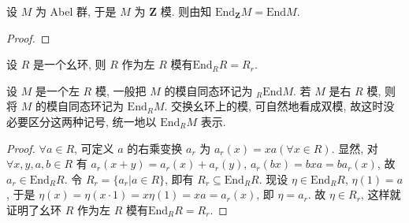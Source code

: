 \documentclass[../../main.tex]{subfiles}
\begin{document}
\begin{example}
设 \( M \) 为 Abel 群, 于是 \( M \) 为 \( \mathbf{Z} \) 模. 则由知 \( \text{End}_\mathbf{Z} M = \text{End}M \).
\end{example}
\begin{proof}

\end{proof}

\begin{example}
设 \( R \) 是一个幺环, 则 \( R \) 作为左 \( R \) 模有\( \text{End}_R R = R_r \).
\end{example}
\begin{remark}
设 \( M \) 是一个左 \( R \) 模, 一般把 \( M \) 的模自同态环记为 \( _R\text{End}M \). 若 \( M \) 是右 \( R \) 模, 则将 \( M \) 的模自同态环记为 \( \text{End}_R M \). 交换幺环上的模, 可自然地看成双模, 故这时没必要区分这两种记号, 统一地以 \( \text{End}_R M \) 表示.
\end{remark}
\begin{proof}
\( \forall a \in R \), 可定义 \( a \) 的右乘变换 \( a_r \) 为 \( a_r(x) = xa (\forall x \in R) \). 显然, 对 \( \forall x, y, a, b \in R \) 有 \( a_r(x + y) = a_r(x) + a_r(y) \), \( a_r(bx) = bxa = ba_r(x) \), 故 \( a_r \in \text{End}_R R \). 令 \( R_r = \{a_r|a \in R\} \), 即有 \( R_r \subseteq \text{End}_R R \). 现设 \( \eta \in \text{End}_R R \), \( \eta(1) = a \), 于是 \( \eta(x) = \eta(x \cdot 1) = x\eta(1) = xa = a_r(x) \), 即 \( \eta = a_r \). 故 \( \eta \in R_r \), 这样就证明了幺环 \( R \) 作为左 \( R \) 模有\( \text{End}_R R = R_r \).
\end{proof}
\end{document}
